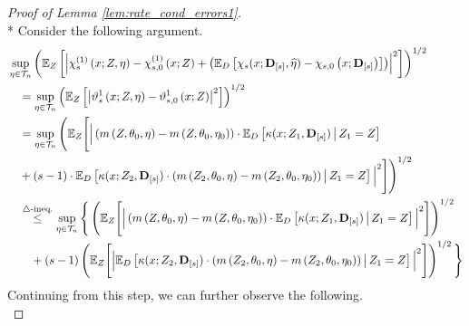 \begin{proof}[Proof of Lemma \ref{lem:rate_cond_errors1}]\mbox{}\\*
    Consider the following argument.
    \begin{equation}
        \begin{aligned}
            & \sup_{\eta \in \mathcal{T}_{n}}\left(
                \mathbb{E}_{Z}\left[
                    \left|\chi_{s}^{(1)}\left(x; Z, \eta\right) 
                    - \chi_{s,0}^{(1)}\left(x; Z\right)
                    + \left(\mathbb{E}_{D}\left[\chi_{s}(x; \mathbf{D}_{[s]}, \widehat{\eta}) - \chi_{s,0}\left(x; \mathbf{D}_{[s]}\right)\right]\right)
                    \right|^2
                \right]
            \right)^{1 / 2} \\
            & \quad = \sup_{\eta \in \mathcal{T}_{n}}\left(
                \mathbb{E}_{Z}\left[\left|\vartheta_{s}^{1}\left(x; Z, \eta\right)
            - \vartheta_{s,0}^{1}\left(x; Z\right) \right|^{2}\right]
            \right)^{1 / 2}\\
            & \quad = \sup_{\eta \in \mathcal{T}_{n}}\Bigg(
                \mathbb{E}_{Z}\Bigg[\Big|
                \left(m\left(Z, \theta_{0}, \eta\right) - m\left(Z, \theta_{0}, \eta_{0}\right)\right) \cdot \mathbb{E}_{D}\left[\kappa(x; Z_{1}, \mathbf{D}_{[s]}) \, \middle| \, Z_1 = Z \right]  \\
            & \quad + (s-1) \cdot \mathbb{E}_{D}\left[\kappa(x; Z_{2}, \mathbf{D}_{[s]})\cdot \left(m\left(Z_{2}, \theta_{0}, \eta\right)
            - m\left(Z_{2}, \theta_{0}, \eta_{0}\right)\right) \, \middle| \, Z_1 = Z \right] 
            \Big|^{2}\Bigg]
            \Bigg)^{1 / 2}\\
            & \quad \overset{\triangle\text{-ineq.}}{\leq} \sup_{\eta \in \mathcal{T}_{n}}\Bigg\{
                \left(\mathbb{E}_{Z}\Bigg[\Big|\left(m\left(Z, \theta_{0}, \eta\right) - m\left(Z, \theta_{0}, \eta_{0}\right)\right) \cdot \mathbb{E}_{D}\left[\kappa(x; Z_{1}, \mathbf{D}_{[s]}) \, \middle| \, Z_1 = Z \right] \Big|^{2}\Bigg]\right)^{1/2}\\
                & \quad \quad + (s-1) \left(\mathbb{E}_{Z}\Bigg[\Big|\mathbb{E}_{D}\left[\kappa(x; Z_{2}, \mathbf{D}_{[s]})\cdot \left(m\left(Z_{2}, \theta_{0}, \eta\right)
            - m\left(Z_{2}, \theta_{0}, \eta_{0}\right)\right) \, \middle| \, Z_1 = Z \right]\Big|^{2}\Bigg]\right)^{1/2}\Bigg\}
        \end{aligned}
    \end{equation}
    Continuing from this step, we can further observe the following.
    \begin{equation}

\end{equation}
\end{proof}

